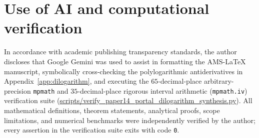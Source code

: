 \documentclass[11pt,reqno]{amsart}
\theoremstyle{definition}
\theoremstyle{remark}
\numberwithin{equation}{section}
\begin{document}
\section*{Use of AI and computational verification}

In accordance with academic publishing transparency standards, the author discloses that Google Gemini was used to assist in formatting the AMS-\LaTeX{} manuscript, symbolically cross-checking the polylogarithmic antiderivatives in Appendix~\ref{app:dilogarithm}, and executing the $65$-decimal-place arbitrary-precision \texttt{mpmath} and $35$-decimal-place rigorous interval arithmetic (\texttt{mpmath.iv}) verification suite (\url{scripts/verify_paper14_portal_dilogarithm_synthesis.py}). All mathematical definitions, theorem statements, analytical proofs, scope limitations, and numerical benchmarks were independently verified by the author; every assertion in the verification suite exits with code \texttt{0}.
\end{document}
